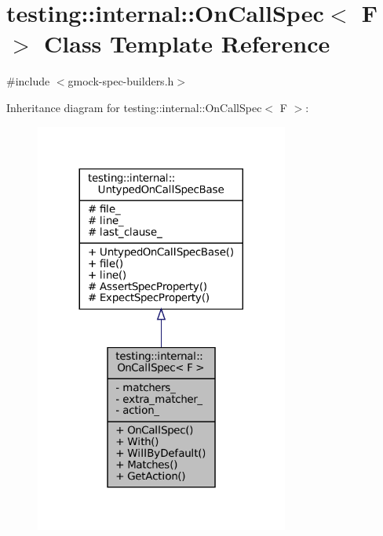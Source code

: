 \hypertarget{classtesting_1_1internal_1_1OnCallSpec}{}\section{testing\+:\+:internal\+:\+:On\+Call\+Spec$<$ F $>$ Class Template Reference}
\label{classtesting_1_1internal_1_1OnCallSpec}


{\ttfamily \#include $<$gmock-\/spec-\/builders.\+h$>$}



Inheritance diagram for testing\+:\+:internal\+:\+:On\+Call\+Spec$<$ F $>$\+:
\nopagebreak
\begin{figure}[H]
\begin{center}
\leavevmode
\includegraphics[width=236pt]{classtesting_1_1internal_1_1OnCallSpec__inherit__graph}
\end{center}
\end{figure}



